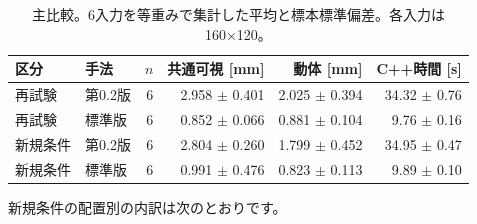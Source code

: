 \begin{table}[H]\centering
\small
\setlength{\tabcolsep}{4pt}
\caption{主比較。6入力を等重みで集計した平均と標本標準偏差。各入力は160×120。}
\begin{tabular}{llrrrr}
\toprule
区分 & 手法 & $n$ & 共通可視 [mm] & 動体 [mm] & C++時間 [s]\\\midrule
再試験 & 第0.2版 & 6 & 2.958 $\pm$ 0.401 & 2.025 $\pm$ 0.394 & 34.32 $\pm$ 0.76\\
再試験 & 標準版 & 6 & 0.852 $\pm$ 0.066 & 0.881 $\pm$ 0.104 & 9.76 $\pm$ 0.16\\
新規条件 & 第0.2版 & 6 & 2.804 $\pm$ 0.260 & 1.799 $\pm$ 0.452 & 34.95 $\pm$ 0.47\\
新規条件 & 標準版 & 6 & 0.991 $\pm$ 0.476 & 0.823 $\pm$ 0.113 & 9.89 $\pm$ 0.10\\
\bottomrule
\end{tabular}
\end{table}
新規条件の配置別の内訳は次のとおりです。

